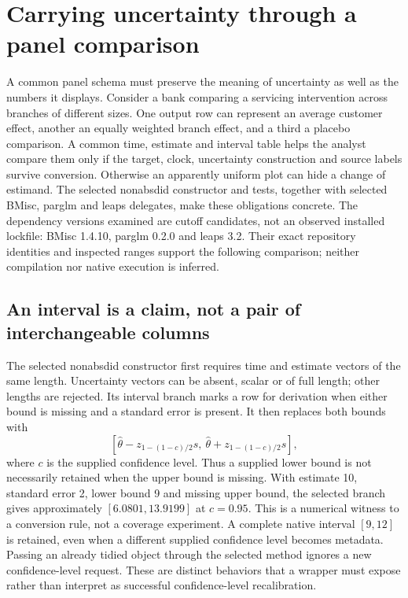 \section{Carrying uncertainty through a panel comparison}
\label{sec:exec29-panel-inference-contracts}

A common panel schema must preserve the meaning of uncertainty as well as the numbers it displays. Consider a bank comparing a servicing intervention across branches of different sizes. One output row can represent an average customer effect, another an equally weighted branch effect, and a third a placebo comparison. A common time, estimate and interval table helps the analyst compare them only if the target, clock, uncertainty construction and source labels survive conversion. Otherwise an apparently uniform plot can hide a change of estimand. The selected nonabsdid constructor and tests, together with selected BMisc, parglm and leaps delegates, make these obligations concrete. The dependency versions examined are cutoff candidates, not an observed installed lockfile: BMisc 1.4.10, parglm 0.2.0 and leaps 3.2. Their exact repository identities and inspected ranges support the following comparison; neither compilation nor native execution is inferred.~\citep{exec29_panel_inference_sources}

\subsection{An interval is a claim, not a pair of interchangeable columns}

The selected nonabsdid constructor first requires time and estimate vectors of the same length. Uncertainty vectors can be absent, scalar or of full length; other lengths are rejected. Its interval branch marks a row for derivation when either bound is missing and a standard error is present. It then replaces both bounds with
\[
 [\widehat\theta-z_{1-(1-c)/2}s,\ \widehat\theta+z_{1-(1-c)/2}s],
\]
where $c$ is the supplied confidence level. Thus a supplied lower bound is not necessarily retained when the upper bound is missing. With estimate 10, standard error 2, lower bound 9 and missing upper bound, the selected branch gives approximately $[6.0801,13.9199]$ at $c=0.95$. This is a numerical witness to a conversion rule, not a coverage experiment. A complete native interval $[9,12]$ is retained, even when a different supplied confidence level becomes metadata. Passing an already tidied object through the selected method ignores a new confidence-level request. These are distinct behaviors that a wrapper must expose rather than interpret as successful confidence-level recalibration.~\citep{exec29_panel_inference_sources,exec29_panel_inference_reference}

